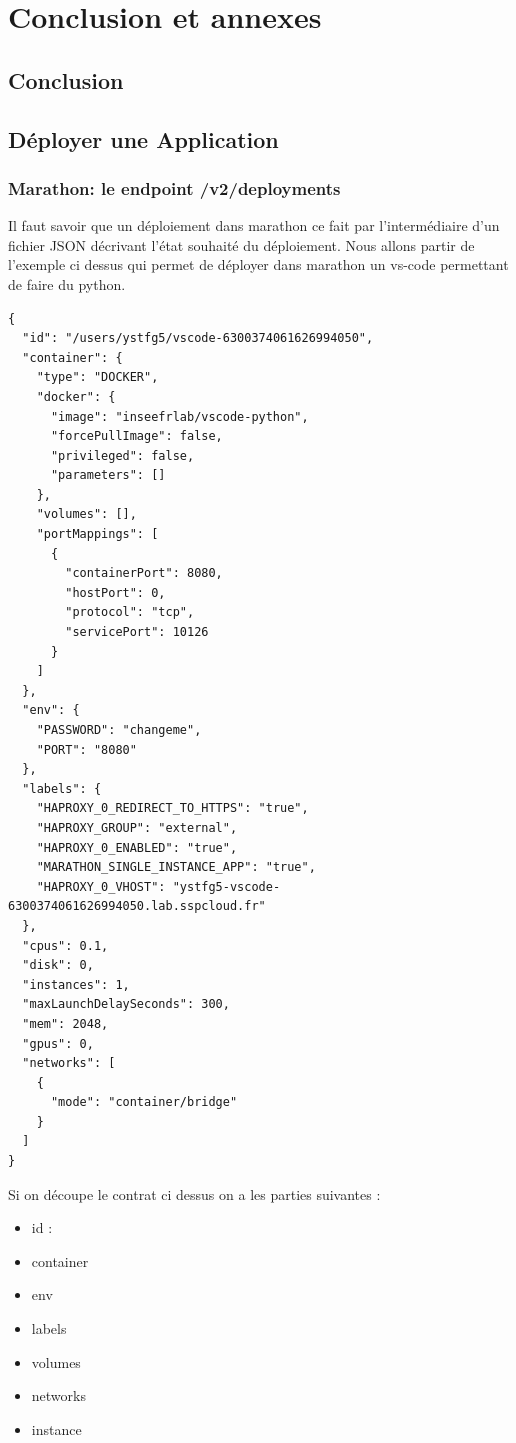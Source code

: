 \documentclass[11pt,fleqn]{book} %
\begin{document}
\part{Conclusion et annexes}
\chapter{Conclusion}

\appendix

\chapter{Déployer une Application}
\label{}
\vspace{-2cm}
\section*{Marathon: le endpoint /v2/deployments}
Il faut savoir que un déploiement dans marathon ce fait par l'intermédiaire d'un fichier JSON décrivant l'état souhaité du déploiement. Nous allons partir de l'exemple ci dessus qui permet de déployer dans marathon un vs-code permettant de faire du python.
\begin{verbatim}
{
  "id": "/users/ystfg5/vscode-6300374061626994050",
  "container": {
    "type": "DOCKER",
    "docker": {
      "image": "inseefrlab/vscode-python",
      "forcePullImage": false,
      "privileged": false,
      "parameters": []
    },
    "volumes": [],
    "portMappings": [
      {
        "containerPort": 8080,
        "hostPort": 0,
        "protocol": "tcp",
        "servicePort": 10126
      }
    ]
  },
  "env": {
    "PASSWORD": "changeme",
    "PORT": "8080"
  },
  "labels": {
    "HAPROXY_0_REDIRECT_TO_HTTPS": "true",
    "HAPROXY_GROUP": "external",
    "HAPROXY_0_ENABLED": "true",
    "MARATHON_SINGLE_INSTANCE_APP": "true",
    "HAPROXY_0_VHOST": "ystfg5-vscode-6300374061626994050.lab.sspcloud.fr"
  },
  "cpus": 0.1,
  "disk": 0,
  "instances": 1,
  "maxLaunchDelaySeconds": 300,
  "mem": 2048,
  "gpus": 0,
  "networks": [
    {
      "mode": "container/bridge"
    }
  ]
}

\end{verbatim}
Si on découpe le contrat ci dessus on a les parties suivantes : 
\begin{itemize}
    \item id :
    \item container
    \item env
    \item labels
    \item volumes
    \item networks
    \item instance 
\end{itemize}
\end{document}
